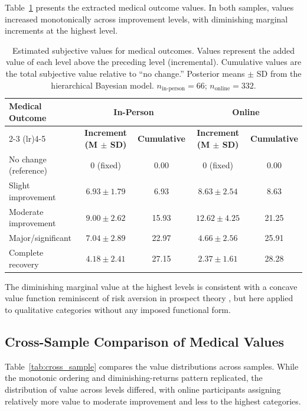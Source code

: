 \documentclass[11pt]{article}
\begin{document}
Table~\ref{tab:medical_values} presents the extracted medical outcome values. In both samples, values increased monotonically across improvement levels, with diminishing marginal increments at the highest level.

\begin{table}[H]
\centering
\caption{Estimated subjective values for medical outcomes. Values represent the added value of each level above the preceding level (incremental). Cumulative values are the total subjective value relative to ``no change.'' Posterior means $\pm$ SD from the hierarchical Bayesian model. $n_{\text{in-person}} = 66$; $n_{\text{online}} = 332$.}
\label{tab:medical_values}
\begin{tabular}{lcccc}
\toprule
\textbf{Medical Outcome} & \multicolumn{2}{c}{\textbf{In-Person}} & \multicolumn{2}{c}{\textbf{Online}} \\
\cmidrule(lr){2-3} \cmidrule(lr){4-5}
& \textbf{Increment (M $\pm$ SD)} & \textbf{Cumulative} & \textbf{Increment (M $\pm$ SD)} & \textbf{Cumulative} \\
\midrule
No change (reference) & 0 (fixed) & 0.00 & 0 (fixed) & 0.00 \\
Slight improvement & $6.93 \pm 1.79$ & 6.93 & $8.63 \pm 2.54$ & 8.63 \\
Moderate improvement & $9.00 \pm 2.62$ & 15.93 & $12.62 \pm 4.25$ & 21.25 \\
Major/significant & $7.04 \pm 2.89$ & 22.97 & $4.66 \pm 2.56$ & 25.91 \\
Complete recovery & $4.18 \pm 2.41$ & 27.15 & $2.37 \pm 1.61$ & 28.28 \\
\bottomrule
\end{tabular}
\end{table}

The diminishing marginal value at the highest levels is consistent with a concave value function reminiscent of risk aversion in prospect theory \citep{kahneman1979prospect}, but here applied to qualitative categories without any imposed functional form.

\subsection{Cross-Sample Comparison of Medical Values}

Table~\ref{tab:cross_sample} compares the value distributions across samples. While the monotonic ordering and diminishing-returns pattern replicated, the distribution of value across levels differed, with online participants assigning relatively more value to moderate improvement and less to the highest categories.
\end{document}

